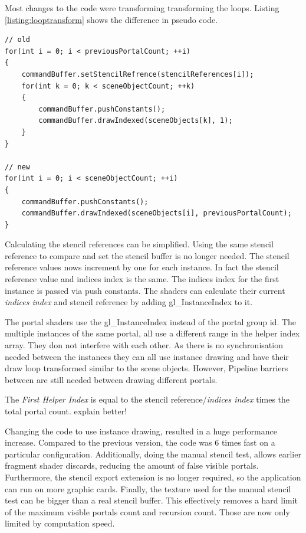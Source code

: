 Most changes to the code were transforming transforming the loops. Listing \ref{listing:looptransform} shows the difference in pseudo code.

\begin{lstlisting}[caption={Pseudocode Loop Transformation}, label=listing:looptransform]
// old 
for(int i = 0; i < previousPortalCount; ++i)
{
	commandBuffer.setStencilRefrence(stencilReferences[i]);
	for(int k = 0; k < sceneObjectCount; ++k)
	{
		commandBuffer.pushConstants();
		commandBuffer.drawIndexed(sceneObjects[k], 1);
	}
}

// new
for(int i = 0; i < sceneObjectCount; ++i)
{
	commandBuffer.pushConstants();
	commandBuffer.drawIndexed(sceneObjects[i], previousPortalCount);
}
\end{lstlisting}

Calculating the stencil references can be simplified. Using the same stencil reference to compare and set the stencil buffer is no longer needed. The stencil reference values nows increment by one for each instance. In fact the stencil reference value and indices index is the same. The indices index for the first instance is passed via push constants. The shaders can calculate their current \textit{indices index} and stencil reference by adding gl\_InstanceIndex to it.

The portal shaders use the gl\_InstanceIndex instead of the portal group id. The multiple instances of the same portal, all use a different range in the helper index array. They don not interfere with each other. As there is no synchronisation needed between the instances they can all use instance drawing and have their draw loop transformed similar to the scene objects. However, Pipeline barriers between are still needed between drawing different portals.

The \textit{First Helper Index} is equal to the stencil reference/\textit{indices index} times the total portal count. {\huge explain better!} %

Changing the code to use instance drawing, resulted in a huge performance increase. Compared to the previous version, the code was 6 times fast on a particular configuration. Additionally, doing the manual stencil test, allows earlier fragment shader discards, reducing the amount of false visible portals. Furthermore, the stencil export extension is no longer required, so the application can run on more graphic cards. Finally, the texture used for the manual stencil test can be bigger than a real stencil buffer. This effectively removes a hard limit of the maximum visible portals count and recursion count. Those are now only limited by computation speed.


